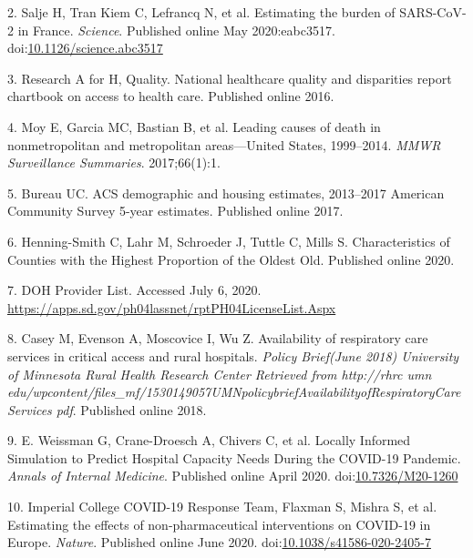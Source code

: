 \documentclass[
]{article}
\begin{document}
\leavevmode\hypertarget{ref-salje_estimating_2020}{}%
2. Salje H, Tran Kiem C, Lefrancq N, et al. Estimating the burden of SARS-CoV-2 in France. \emph{Science}. Published online May 2020:eabc3517. doi:\href{https://doi.org/10.1126/science.abc3517}{10.1126/science.abc3517}

\leavevmode\hypertarget{ref-research_national_2016}{}%
3. Research A for H, Quality. National healthcare quality and disparities report chartbook on access to health care. Published online 2016.

\leavevmode\hypertarget{ref-moy_leading_2017}{}%
4. Moy E, Garcia MC, Bastian B, et al. Leading causes of death in nonmetropolitan and metropolitan areas---United States, 1999--2014. \emph{MMWR Surveillance Summaries}. 2017;66(1):1.

\leavevmode\hypertarget{ref-bureau_acs_2017}{}%
5. Bureau UC. ACS demographic and housing estimates, 2013--2017 American Community Survey 5-year estimates. Published online 2017.

\leavevmode\hypertarget{ref-henning-smith_characteristics_2020}{}%
6. Henning-Smith C, Lahr M, Schroeder J, Tuttle C, Mills S. Characteristics of Counties with the Highest Proportion of the Oldest Old. Published online 2020.

\leavevmode\hypertarget{ref-noauthor_doh_nodate}{}%
7. DOH Provider List. Accessed July 6, 2020. \url{https://apps.sd.gov/ph04lassnet/rptPH04LicenseList.Aspx}

\leavevmode\hypertarget{ref-casey_availability_2018}{}%
8. Casey M, Evenson A, Moscovice I, Wu Z. Availability of respiratory care services in critical access and rural hospitals. \emph{Policy Brief(June 2018) University of Minnesota Rural Health Research Center Retrieved from http://rhrc umn edu/wpcontent/files\_mf/1530149057UMNpolicybriefAvailabilityofRespiratoryCareServices pdf}. Published online 2018.

\leavevmode\hypertarget{ref-e_weissman_locally_2020}{}%
9. E. Weissman G, Crane-Droesch A, Chivers C, et al. Locally Informed Simulation to Predict Hospital Capacity Needs During the COVID-19 Pandemic. \emph{Annals of Internal Medicine}. Published online April 2020. doi:\href{https://doi.org/10.7326/M20-1260}{10.7326/M20-1260}

\leavevmode\hypertarget{ref-imperial_college_covid-19_response_team_estimating_2020}{}%
10. Imperial College COVID-19 Response Team, Flaxman S, Mishra S, et al. Estimating the effects of non-pharmaceutical interventions on COVID-19 in Europe. \emph{Nature}. Published online June 2020. doi:\href{https://doi.org/10.1038/s41586-020-2405-7}{10.1038/s41586-020-2405-7}
\end{document}
